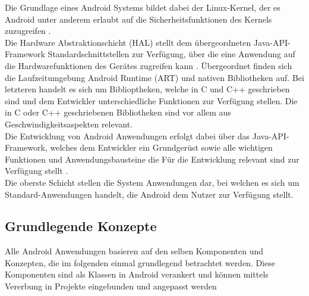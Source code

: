 Die Grundlage eines Android Systems bildet dabei der Linux-Kernel, der es Android unter anderem erlaubt auf die Sicherheitsfunktionen des Kernels zuzugreifen \citep{android:architecture}. \\
Die Hardware Abstraktionschicht (HAL) stellt dem übergeordneten Java-API-Framework Standardschnittstellen zur Verfügung, über die eine Anwendung auf die Hardwarefunktionen des Gerätes zugreifen kann \citep{android:architecture}.
Übergeordnet finden sich die Laufzeitumgebung Android Runtime (ART) und nativen Bibliotheken auf. Bei letzteren handelt es sich um Biblioptheken, welche in C und C++ geschrieben sind \citep{android:architecture} und dem Entwickler unterschiedliche Funktionen zur Verfügung stellen. Die in C oder C++ geschriebenen Bibliotheken sind vor allem aus Geschwindigkeitsaspekten relevant. \\
Die Entwicklung von Android Anwendungen erfolgt dabei über das Java-API-Framework, welches dem Entwickler ein Grundgerüst sowie alle wichtigen Funktionen und Anwendungsbausteine die Für die Entwicklung relevant sind zur Verfügung stellt \citep{android:architecture}.\\
Die oberste Schicht stellen die System Anwendungen dar, bei welchen es sich um Standard-Anwendungen handelt, die Android dem Nutzer zur Verfügung stellt.

\subsection{Grundlegende Konzepte}
Alle Android Anwendungen basieren auf den selben Komponenten und Konzepten, die im folgenden einmal grundlegend betrachtet werden. Diese Komponenten sind als Klassen in Android verankert und können mittels Vererbung in Projekte eingebunden und angepasst werden 

